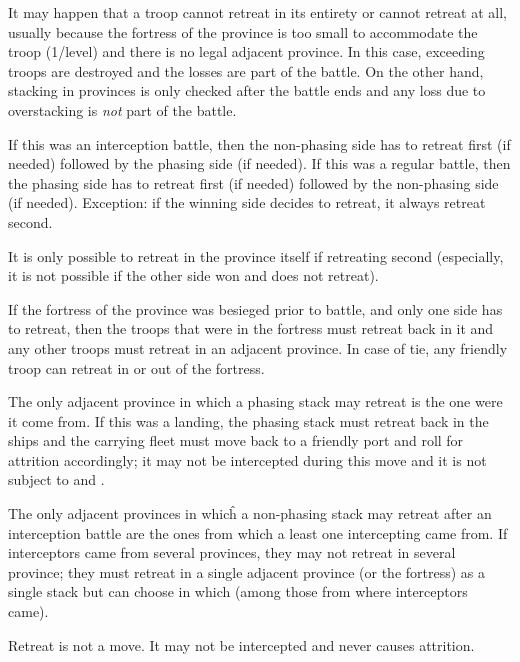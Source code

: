 It may happen that a troop cannot retreat in its entirety or cannot retreat at
all, usually because the fortress of the province is too small to accommodate
the troop (1\LD/level) and there is no legal adjacent province. In this case,
exceeding troops are destroyed and the losses are part of the battle. On the
other hand, stacking in provinces is only checked after the battle ends and
any loss due to overstacking is \emph{not} part of the battle.

If this was an interception battle, then the non-phasing side has to retreat
first (if needed) followed by the phasing side (if needed). If this was a
regular battle, then the phasing side has to retreat first (if needed)
followed by the non-phasing side (if needed). Exception: if the winning side
decides to retreat, it always retreat second.

It is only possible to retreat in the province itself if retreating second
(especially, it is not possible if the other side won and does not retreat).

If the fortress of the province was besieged prior to battle, and only one
side has to retreat, then the troops that were in the fortress must retreat
back in it and any other troops must retreat in an adjacent province. In case
of tie, any friendly troop can retreat in or out of the fortress.

The only adjacent province in which a phasing stack may retreat is the one
were it come from. If this was a landing, the phasing stack must retreat back
in the ships and the carrying fleet must move back to a friendly port and roll
for attrition accordingly; it may not be intercepted during this move and it
is not subject to \Presidios and \StraitFort.

The only adjacent provinces in whicĥ a non-phasing stack may retreat after an
interception battle are the ones from which a least one intercepting \LDE came
from. If interceptors came from several provinces, they may not retreat in
several province; they must retreat in a single adjacent province (or the
fortress) as a single stack but can choose in which (among those from where
interceptors came).

Retreat is not a move. It may not be intercepted and never causes attrition.

